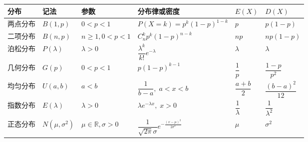 \documentclass[12pt, a4paper]{article}
\begin{document}
\begin{center}
    \renewcommand{\arraystretch}{2.2}
    \begin{tabular}{llllll}
        \toprule
        分布   & 记法                                                             & 参数                          & 分布律或密度                 & $E(X)$ & $D(X)$ \\
        \midrule
        两点分布 & $B(1,p)$                                                       & $0<p<1$
             & $P(X=k)=p^k(1-p)^{1-k}$                                        & $p$                         & $p(1-p)$                                 \\
        二项分布 & $B(n,p)$                                                       & $n\ge1,0<p<1$
             & $C_n^k p^k(1-p)^{n-k}$                                         & $np$                        & $np(1-p)$                                \\
        泊松分布 & $P(\lambda)$                                                   & $\lambda>0$
             & $\dfrac{\lambda^k}{k!}e^{-\lambda}$                            & $\lambda$                   & $\lambda$                                \\
        几何分布 & $G(p)$                                                         & $0<p<1$
             & $p(1-p)^{k-1}$                                                 & $\dfrac{1}{p}$              & $\dfrac{1-p}{p^2}$                       \\
        均匀分布 & $U(a,b)$                                                       & $a<b$
             & $\dfrac{1}{b-a},\;a<x<b$                                       & $\dfrac{a+b}{2}$            & $\dfrac{(b-a)^2}{12}$                    \\
        指数分布 & $E(\lambda)$                                                   & $\lambda>0$
             & $\lambda e^{-\lambda x},\;x>0$                                 & $\dfrac{1}{\lambda}$        & $\dfrac{1}{\lambda^2}$                   \\
        正态分布 & $N(\mu,\sigma^2)$                                              & $\mu\in\mathbb{R},\sigma>0$
             & $\dfrac{1}{\sqrt{2\pi}\sigma}e^{-\frac{(x-\mu)^2}{2\sigma^2}}$
             & $\mu$                                                          & $\sigma^2$                                                             \\
        \bottomrule
    \end{tabular}
\end{center}
\end{document}
